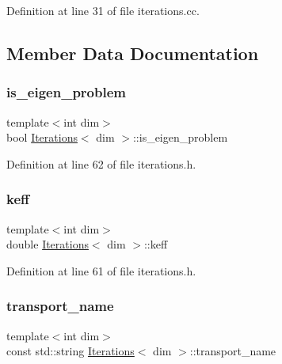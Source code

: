Definition at line 31 of file iterations.\+cc.



\subsection{Member Data Documentation}
\mbox{\label{class_iterations_acfd49ecddab96b70fc271942b3173ad7}} 
\subsubsection{\texorpdfstring{is\+\_\+eigen\+\_\+problem}{is\_eigen\_problem}}
{\footnotesize\ttfamily template$<$int dim$>$ \\
bool \hyperlink{class_iterations}{Iterations}$<$ dim $>$\+::is\+\_\+eigen\+\_\+problem\hspace{0.3cm}{\ttfamily [private]}}



Definition at line 62 of file iterations.\+h.

\mbox{\label{class_iterations_a4c36c8bdd6775be8015ef113c68a1e66}} 
\subsubsection{\texorpdfstring{keff}{keff}}
{\footnotesize\ttfamily template$<$int dim$>$ \\
double \hyperlink{class_iterations}{Iterations}$<$ dim $>$\+::keff\hspace{0.3cm}{\ttfamily [private]}}



Definition at line 61 of file iterations.\+h.

\mbox{\label{class_iterations_a3a29339b09351ffa95e9c99be5d5e575}} 
\subsubsection{\texorpdfstring{transport\+\_\+name}{transport\_name}}
{\footnotesize\ttfamily template$<$int dim$>$ \\
const std\+::string \hyperlink{class_iterations}{Iterations}$<$ dim $>$\+::transport\+\_\+name\hspace{0.3cm}{\ttfamily [private]}}



